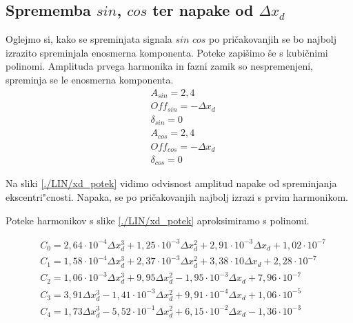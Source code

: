 \subsection{Sprememba $sin$, $cos$ ter napake od $\Delta x_d$}
Oglejmo si, kako se spreminjata signala $sin$ $cos$ po pričakovanjih se bo najbolj izrazito spreminjala enosmerna komponenta.
Poteke zapišimo še s kubičnimi polinomi. Amplituda prvega harmonika in fazni zamik so nespremenjeni, spreminja se le enosmerna komponenta.
\begin{eqnarray}
\label{analog_lin_xd}
&A_{sin} = 2,4\\
&Off_{sin} = -\Delta x_d \\
&\delta_{sin} =0 \\
&A_{cos} = 2,4\\
&Off_{cos} = -\Delta x_d\\
&\delta_{cos} = 0
\end{eqnarray}

Na sliki \ref{./LIN/xd_potek} vidimo odvisnost amplitud napake od spreminjanja ekscentri"cnosti. Napaka, se po pričakovanjih najbolj izrazi s prvim harmonikom.


Poteke harmonikov s slike \ref{./LIN/xd_potek} aproksimiramo  s polinomi. 

\begin{eqnarray}
\label{nap_lin_xd}
&C_0 =2,64\cdot 10^{-4}\Delta x_d^{3}+1,25\cdot 10^{-3}\Delta x_d^{2}+2,91\cdot 10^{-3}\Delta x_d+1,02\cdot 10^{-7} \\
&C_1 =1,58\cdot 10^{-4}\Delta x_d^{3}+2,37\cdot 10^{-3}\Delta x_d^{2}+3,38\cdot 10\Delta x_d+2,28\cdot 10^{-7} \\     
&C_2 =1,06\cdot 10^{-3}\Delta x_d^{3}+9,95\Delta x_d^{2}-1,95\cdot 10^{-3}\Delta x_d+7,96\cdot 10^{-7} \\             
&C_3 =3,91\Delta x_d^{3}-1,41\cdot 10^{-3}\Delta x_d^{2}+9,91\cdot 10^{-4}\Delta x_d+1,06\cdot 10^{-5} \\               
&C_4 =1,73\Delta x_d^{3}-5,52\cdot 10^{-1}\Delta x_d^{2}+6,15\cdot 10^{-2}\Delta x_d-1,36\cdot 10^{-3}            
\end{eqnarray}

